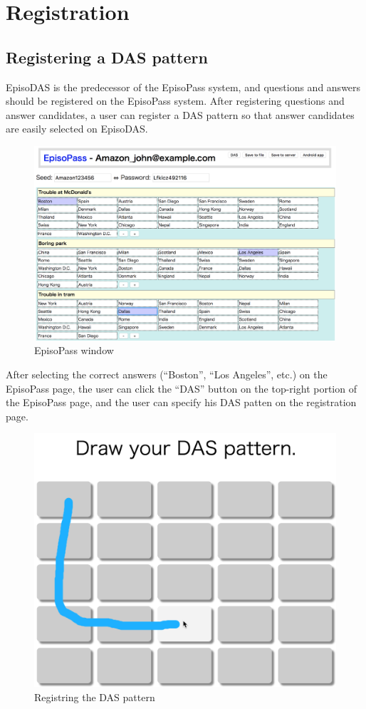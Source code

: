 \documentclass[sigconf]{acmart}
\begin{document}
\section{Registration}

\subsection{Registering a DAS pattern}

EpisoDAS is the predecessor of the EpisoPass system,
and questions and answers should be registered on the EpisoPass system.
After registering questions and answer candidates,
a user can register a DAS pattern so that
answer candidates are easily selected on EpisoDAS.

\begin{figure}[H]
  \includegraphics[width=12cm,bb=0 0 1832 1180]{figures/JohnEpisodes.png}
  \caption{EpisoPass window}
  \label{JohnEpisodes}
\end{figure}

After selecting the correct answers
(``Boston'', ``Los Angeles'', etc.) on the EpisoPass page,
the user can click the ``DAS'' button on the top-right portion of the
EpisoPass page,
%
and the user can specify his DAS patten on the registration page.

\begin{figure}[H]
  \includegraphics[width=12cm,bb=0 0 1332 1118]{figures/DASRegister.png}
  \caption{Registring the DAS pattern}
  \label{DASRegister}
\end{figure}
\end{document}
